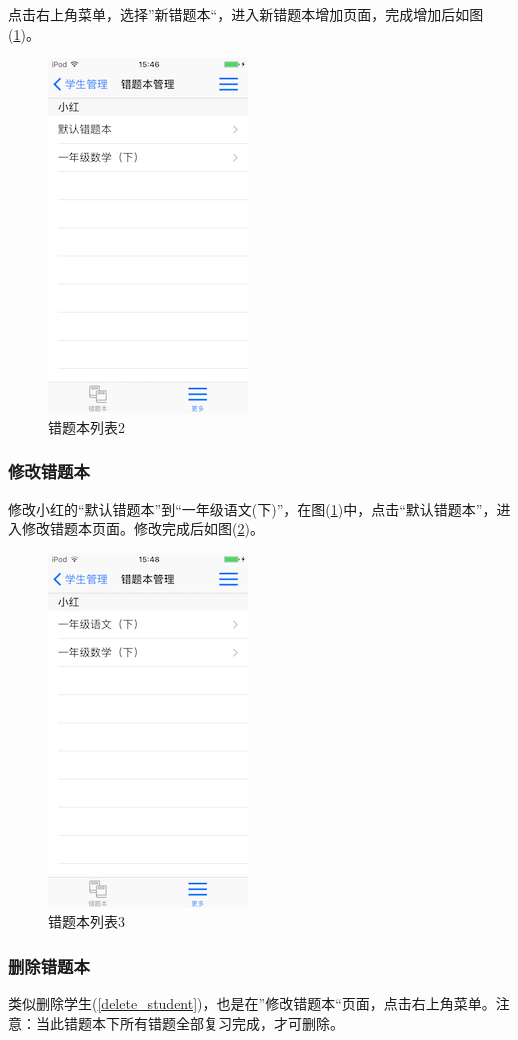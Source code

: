 点击右上角菜单，选择”新错题本“，进入新错题本增加页面，完成增加后如图(\ref{img16})。
\begin{figure}[H]
	\centering
	\includegraphics{img/16.png}
	\caption{错题本列表2}
	\label{img16}
\end{figure}

\subsubsection{修改错题本}
修改小红的“默认错题本”到“一年级语文(下)”，在图(\ref{img16})中，点击“默认错题本”，进入修改错题本页面。修改完成后如图(\ref{img17})。
\begin{figure}[H]
	\centering
	\includegraphics{img/17.png}
	\caption{错题本列表3}
	\label{img17}
\end{figure}

\subsubsection{删除错题本}
类似删除学生(\ref{delete_student})，也是在”修改错题本“页面，点击右上角菜单。注意：当此错题本下所有错题全部复习完成，才可删除。